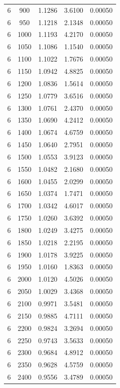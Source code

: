 \begin{longtable}{ccccc}
    6 & 900 & 1.1286 & 3.6100 & 0.00050 \\
    6 & 950 & 1.1218 & 2.1348 & 0.00050 \\
    6 & 1000 & 1.1193 & 4.2170 & 0.00050 \\
    6 & 1050 & 1.1086 & 1.1540 & 0.00050 \\
    6 & 1100 & 1.1022 & 1.7676 & 0.00050 \\
    6 & 1150 & 1.0942 & 4.8825 & 0.00050 \\
    6 & 1200 & 1.0836 & 1.5614 & 0.00050 \\
    6 & 1250 & 1.0779 & 3.6516 & 0.00050 \\
    6 & 1300 & 1.0761 & 2.4370 & 0.00050 \\
    6 & 1350 & 1.0690 & 4.2412 & 0.00050 \\
    6 & 1400 & 1.0674 & 4.6759 & 0.00050 \\
    6 & 1450 & 1.0640 & 2.7951 & 0.00050 \\
    6 & 1500 & 1.0553 & 3.9123 & 0.00050 \\
    6 & 1550 & 1.0482 & 2.1680 & 0.00050 \\
    6 & 1600 & 1.0455 & 2.0299 & 0.00050 \\
    6 & 1650 & 1.0374 & 1.7471 & 0.00050 \\
    6 & 1700 & 1.0342 & 4.6017 & 0.00050 \\
    6 & 1750 & 1.0260 & 3.6392 & 0.00050 \\
    6 & 1800 & 1.0249 & 3.4275 & 0.00050 \\
    6 & 1850 & 1.0218 & 2.2195 & 0.00050 \\
    6 & 1900 & 1.0178 & 3.9225 & 0.00050 \\
    6 & 1950 & 1.0160 & 1.8363 & 0.00050 \\
    6 & 2000 & 1.0120 & 4.5026 & 0.00050 \\
    6 & 2050 & 1.0029 & 3.4368 & 0.00050 \\
    6 & 2100 & 0.9971 & 3.5481 & 0.00050 \\
    6 & 2150 & 0.9885 & 4.7111 & 0.00050 \\
    6 & 2200 & 0.9824 & 3.2694 & 0.00050 \\
    6 & 2250 & 0.9743 & 3.5633 & 0.00050 \\
    6 & 2300 & 0.9684 & 4.8912 & 0.00050 \\
    6 & 2350 & 0.9628 & 4.5759 & 0.00050 \\
    6 & 2400 & 0.9556 & 3.4789 & 0.00050 \\

\end{longtable}
